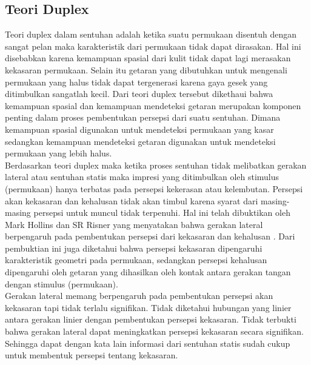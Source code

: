 	\subsection{Teori Duplex}
	\indent  Teori duplex dalam sentuhan adalah ketika suatu permukaan disentuh dengan sangat pelan maka karakteristik dari permukaan tidak dapat dirasakan\cite{katz2013world}. Hal ini disebabkan karena kemampuan spasial dari kulit tidak dapat lagi merasakan kekasaran permukaan. Selain itu getaran yang dibutuhkan untuk mengenali permukaan yang halus tidak dapat tergenerasi karena gaya gesek yang ditimbulkan sangatlah kecil. Dari teori duplex tersebut dikethaui bahwa kemampuan spasial dan kemampuan mendeteksi getaran merupakan komponen penting dalam proses pembentukan persepsi dari suatu sentuhan. Dimana kemampuan spasial digunakan untuk mendeteksi permukaan yang kasar sedangkan kemampuan mendeteksi getaran digunakan untuk mendeteksi permukaan yang lebih halus. \\
	\indent Berdasarkan teori duplex maka ketika proses sentuhan tidak melibatkan gerakan lateral atau sentuhan statis maka impresi yang ditimbulkan oleh stimulus (permukaan) hanya terbatas pada persepsi kekerasan atau kelembutan. Persepsi akan kekasaran dan kehalusan tidak akan timbul karena syarat dari masing-masing persepsi untuk muncul tidak terpenuhi. Hal ini telah dibuktikan oleh Mark Hollins dan SR Risner yang menyatakan bahwa gerakan lateral berpengaruh pada pembentukan persepsi dari kekasaran dan kehalusan \cite{Hollins2000a}. Dari pembuktian ini juga diketahui bahwa persepsi kekasaran dipengaruhi karakteristik geometri pada permukaan, sedangkan persepsi kehalusan dipengaruhi oleh getaran yang dihasilkan oleh kontak antara gerakan tangan dengan stimulus (permukaan). \\
	\indent Gerakan lateral memang berpengaruh pada pembentukan persepsi akan kekasaran tapi tidak terlalu signifikan. Tidak diketahui hubungan yang linier antara gerakan linier dengan pembentukan persepsi kekasaran. Tidak terbukti bahwa gerakan lateral dapat meningkatkan persepsi kekasaran secara signifikan\cite{Taylor1975}. Sehingga dapat dengan kata lain informasi dari sentuhan statis sudah cukup untuk membentuk persepsi tentang kekasaran.  
	

